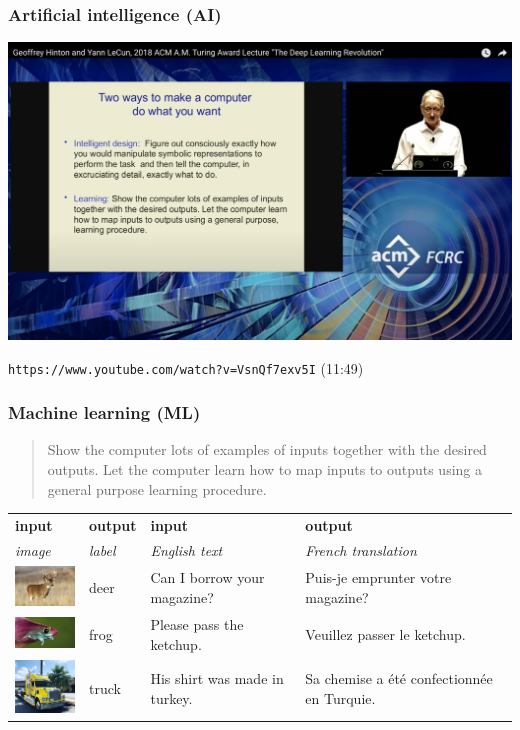 \documentclass{beamer}
\begin{document}
    \begin{frame}
        \frametitle{Artificial intelligence (AI)}

        \includegraphics[width=\textwidth]{hinton-two-ways.jpg}

        \texttt{https://www.youtube.com/watch?v=VsnQf7exv5I} (11:49)
    \end{frame}

    \begin{frame}
        \frametitle{Machine learning (ML)}

        \bigskip
        \begin{quote}
            Show the computer lots of examples of inputs together with the desired outputs.
            Let the computer learn how to map inputs to outputs using a general purpose learning procedure.
        \end{quote}

        \bigskip
        \begin{tabular}{ m{0.75in} m{0.5in} || m{1in} m{1.25in} }
            \textbf{input}&\textbf{output}&\textbf{input}&\textbf{output}\\[0.5em]
            \textit{image}&\textit{label}&\textit{English text}&\textit{French translation}\\[0.5em]
            \includegraphics[width=0.75in]{deer.jpg}&deer&\footnotesize Can I borrow your magazine?&\footnotesize Puis-je emprunter votre magazine?\\
            \includegraphics[width=0.75in]{frog.jpg}&frog&\footnotesize Please pass the ketchup.&\footnotesize Veuillez passer le ketchup.\\
            \includegraphics[width=0.75in]{truck.jpg}&truck&\footnotesize His shirt was made in turkey.&\footnotesize Sa chemise a \'et\'e confectionnée en Turquie.\\
        \end{tabular}
    \end{frame}
    
\end{document}

